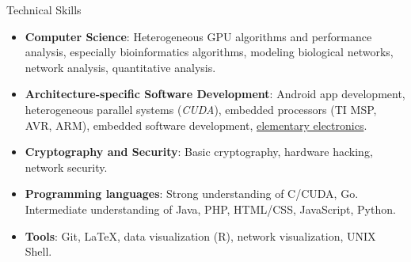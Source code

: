 \documentclass[11pt,oneside]{article}
\newenvironment{ressection}[1]{
	\vspace{4pt}
	{\textbf\selectfont\Large\fontspec{Roboto-Thin.ttf}\textcolor{Sepia}{#1}}
	\begin{itemize}[topsep=6pt]
	\vspace{0pt}
}{
	\end{itemize}
}
\newcommand{\resitem}[1]{
	\vspace{-4pt}
	\item \begin{flushleft} #1 \end{flushleft}
}
\newenvironment{reslist}[1]{
	\resitem{\textbf{#1}}
	\vspace{-5pt}
	\begin{itemize}
}{
	\end{itemize}
}
\begin{document}







\begin{ressection}{Technical Skills}
		
        \resitem{\textbf{Computer Science}: Heterogeneous GPU algorithms and performance analysis, especially bioinformatics algorithms, modeling biological networks, network analysis, quantitative analysis.}

        \resitem{\textbf{Architecture-specific Software Development}: Android app development, heterogeneous parallel systems (\textit{CUDA}), embedded processors (TI MSP, AVR, ARM), embedded software development, \href{https://verify.edxonline.org/cert/e8322a7ae5cb463496f1ab2414c19596}{elementary electronics}.}
	
	    \resitem{\textbf{Cryptography and Security}: Basic  cryptography, hardware hacking, network security.}
	

		\resitem{\textbf{Programming languages}: Strong understanding of C/CUDA, Go. Intermediate understanding of Java, PHP, HTML/CSS, JavaScript, Python.}
		
		\resitem{\textbf{Tools}: Git, LaTeX, data visualization (R), network visualization, UNIX Shell.}

		

\end{ressection}
\vspace{8 pt}
\end{document}
